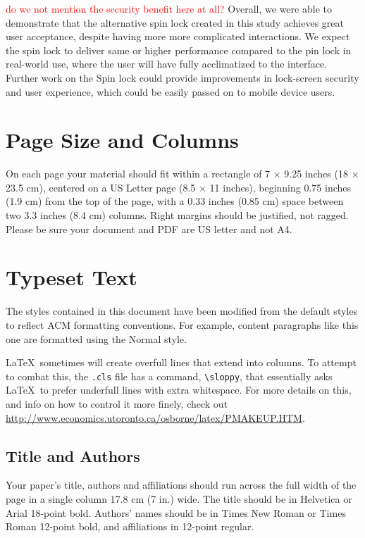 \documentclass{sigchi}
\newcommand{\comment}[1]{\textcolor{red}{#1}}
\begin{document}
\comment{do we not mention the security benefit here at all?}
Overall, we were able to demonstrate that the alternative spin lock created in this study achieves great user acceptance, despite having more more complicated interactions. We expect the spin lock to deliver same or higher performance compared to the pin lock in real-world use, where the user will have fully acclimatized to the interface. Further work on the Spin lock could provide improvements in lock-screen security and user experience, which could be easily passed on to mobile device users. 

\iffalse
\section{Page Size and Columns}
On each page your material should fit within a rectangle of 7 $\times$
9.25 inches (18 $\times$ 23.5 cm), centered on a US Letter page (8.5
$\times$ 11 inches), beginning 0.75 inches (1.9 cm) from the top of
the page, with a 0.33 inches (0.85 cm) space between two 3.3 inches
(8.4 cm) columns. Right margins should be justified, not
ragged. Please be sure your document and PDF are US letter and not A4.


\section{Typeset Text}
The styles contained in this document have been modified from the
default styles to reflect ACM formatting conventions. For example,
content paragraphs like this one are formatted using the Normal style.


\LaTeX\ sometimes will create overfull lines that extend into columns.
To attempt to combat this, the \texttt{.cls} file has a command,
\texttt{{\textbackslash}sloppy}, that essentially asks \LaTeX\ to
prefer underfull lines with extra whitespace.  For more details on
this, and info on how to control it more finely, check out
{\url{http://www.economics.utoronto.ca/osborne/latex/PMAKEUP.HTM}}.

\subsection{Title and Authors}

Your paper's title, authors and affiliations should run across the
full width of the page in a single column 17.8 cm (7 in.) wide.  The
title should be in Helvetica or Arial 18-point bold.  Authors' names
should be in Times New Roman or Times Roman 12-point bold, and
affiliations in 12-point regular.  
\end{document}

